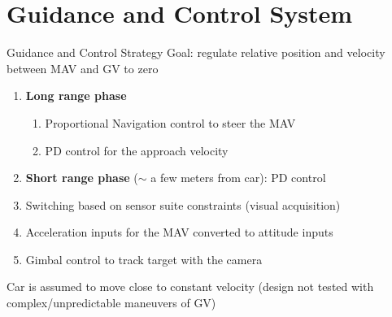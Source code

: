 \section{Guidance and Control System}



\begin{frame}{Guidance and Control Strategy}
	Goal: regulate relative position and velocity between MAV and GV to zero
	\begin{enumerate}
	\item \textbf{Long range phase}
	\begin{enumerate}
		\item Proportional Navigation control to steer the MAV
		\item PD control for the approach velocity
	\end{enumerate}
	\item \textbf{Short range phase} ($\sim$ a few meters from car): PD control
	\item Switching based on sensor suite constraints (visual acquisition)
	\item Acceleration inputs for the MAV converted to attitude inputs %
	\item Gimbal control to track target with the camera
	\end{enumerate}
	Car is assumed to move close to constant velocity (design not tested with complex/unpredictable maneuvers
	of GV)

	
\end{frame}


